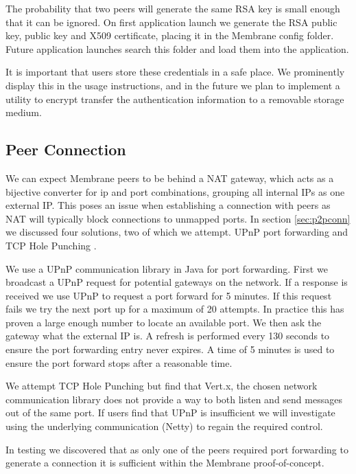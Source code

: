 \documentclass[11pt, a4paper, twocolumn, twoside]{report}
\begin{document}
The probability that two peers will generate the same RSA key is small enough that it can be ignored. On first application launch we generate the RSA public key, public key and X509 certificate, placing it in the Membrane config folder. Future application launches search this folder and load them into the application.

It is important that users store these credentials in a safe place. We prominently display this in the usage instructions, and in the future we plan to implement a utility to encrypt transfer the authentication information to a removable storage medium.

\subsection{Peer Connection}

We can expect Membrane peers to be behind a NAT gateway, which acts as a bijective converter for ip and port combinations, grouping all internal IPs as one external IP. This poses an issue when establishing a connection with peers as NAT will typically block connections to unmapped ports. In section \ref{sec:p2pconn} we discussed four solutions, two of which we attempt. UPnP port forwarding \citep{boucadair2013universal} and TCP Hole Punching \citep{wing2010traversal}.

We use a UPnP communication library in Java for port forwarding. First we broadcast a UPnP request for potential gateways on the network. If a response is received we use UPnP to request a port forward for 5 minutes. If this request fails we try the next port up for a maximum of 20 attempts. In practice this has proven a large enough number to locate an available port. We then ask the gateway what the external IP is. A refresh is performed every 130 seconds to ensure the port forwarding entry never expires. A time of 5 minutes is used to ensure the port forward stops after a reasonable time.

We attempt TCP Hole Punching but find that Vert.x, the chosen network communication library does not provide a way to both listen and send messages out of the same port. If users find that UPnP is insufficient we will investigate using the underlying communication (Netty) to regain the required control.

In testing we discovered that as only one of the peers required port forwarding to generate a connection it is sufficient within the Membrane proof-of-concept.
\end{document}
